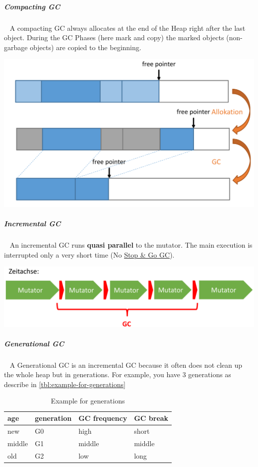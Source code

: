 \documentclass[11pt,twoside,landscape]{article}
\begin{document}
\begin{multicols}{3}
\subparagraph{Compacting GC} \
\label{sec:orgd20c4cb}
A compacting GC always allocates at the end of the Heap right after the last object.
During the GC Phases (here mark and copy) the marked objects (non-garbage objects) are copied to the beginning.


{
\begin{center}
\includegraphics[width=.9\linewidth]{img/compacting_gc.png}
\end{center}
\label{fig:compacting-gc-example}
}
\subparagraph{Incremental GC} \
\label{sec:org2fa6b69}
An incremental GC runs \textbf{quasi parallel} to the mutator.
The main execution is interrupted only a very short time (No \href{../../../roam/20221230204307-when_is_the_garbage_collector_executed.org}{Stop \& Go GC}).


{
\begin{center}
\includegraphics[width=.9\linewidth]{img/incremental_gc.png}
\end{center}
\captionof{figure}{Incremental GC}\label{fig:incremental-gc}
}

\subparagraph{Generational GC} \
\label{sec:org7160787}
A Generational GC is an incremental GC because it often does not clean up the whole heap but in generations.
For example, you have 3 generations as describe in \autoref{tbl:example-for-generations}

\begin{table}[htbp]
\caption{\label{tbl:example-for-generations}Example for generations}
\centering
\begin{tabular}{llll}
age & generation & GC frequency & GC break\\[0pt]
\hline
new & G0 & high & short\\[0pt]
middle & G1 & middle & middle\\[0pt]
old & G2 & low & long\\[0pt]
\end{tabular}
\end{table}


\end{multicols}
\end{document}

